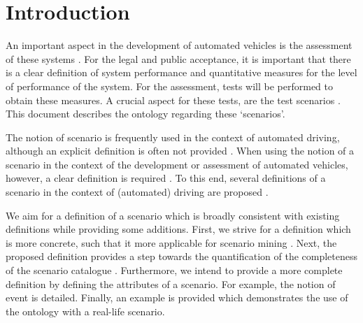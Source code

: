 \section{Introduction}
\label{sec:introduction}

An important aspect in the development of automated vehicles is the assessment of these systems \cite{bengler2014threedecades, stellet2015taxonomy, Helmer2017safety, putz2017pegasus, roesener2017comprehensive, gietelink2006development}. For the legal and public acceptance, it is important that there is a clear definition of system performance and quantitative measures for the level of performance of the system. For the assessment, tests will be performed to obtain these measures. A crucial aspect for these tests, are the test scenarios \cite{stellet2015taxonomy}. This document describes the ontology regarding these `scenarios'.

The notion of scenario is frequently used in the context of automated driving, although an explicit definition is often not provided \cite{putz2017pegasus, roesener2017comprehensive, gietelink2006development, hulshof2013autonomous, karaduman2013interactivebehavior, englund2016grand, xu2002effects, ebner2011identifying, ploeg2017GCDC, zofka2015datadrivetrafficscenarios}. When using the notion of a scenario in the context of the development or assessment of automated vehicles, however, a clear definition is required \cite{stellet2015taxonomy, Helmer2017safety, alvarez2017prospective, zofka2015datadrivetrafficscenarios, aparicio2013pre, lesemann2011test, putz2017pegasus, geyer2014, ulbrich2015}. To this end, several definitions of a scenario in the context of (automated) driving are proposed \cite{geyer2014, ulbrich2015, elrofai2016scenario}.

We aim for a definition of a scenario which is broadly consistent with existing definitions \cite{geyer2014, ulbrich2015, elrofai2016scenario} while providing some additions. First, we strive for a definition which is more concrete, such that it more applicable for scenario mining \cite{elrofai2016scenario}. Next, the proposed definition provides a step towards the quantification of the completeness of the scenario catalogue \cite{geyer2014, alvarez2017prospective, stellet2015taxonomy}. Furthermore, we intend to provide a more complete definition by defining the attributes of a scenario. For example, the notion of event is detailed. Finally, an example is provided which demonstrates the use of the ontology with a real-life scenario.

